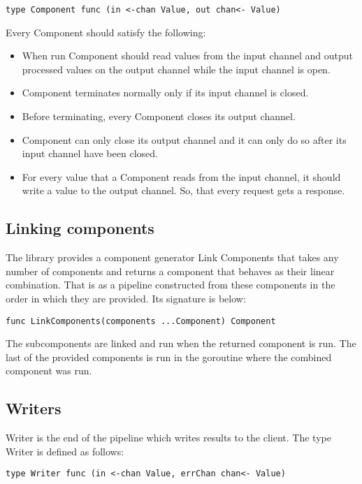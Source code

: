 \documentclass[12pt,a4paper]{article}
\begin{document}
\begin{lstlisting}
type Component func (in <-chan Value, out chan<- Value)
\end{lstlisting}

Every Component should satisfy the following:
\begin{itemize}
  \item When run Component should read values from the input channel
				and output processed values on the output channel while the input 
				channel is open.
	\item Component terminates normally only if its input channel is closed.
	\item Before terminating, every Component closes its output channel.
	\item Component can only close its output channel and it can only do so
				after its input channel have been closed.
	\item For every value that a Component reads from the input channel, 
				it should write a value to the output channel. So, that every request 
				gets a response.
  
\end{itemize}

\subsection{Linking components}
The library provides a component generator Link Components that takes 
any number of components and returns a component that behaves as their 
linear combination. That is as a pipeline constructed from these components 
in the order in which they are provided. Its signature is below:
\begin{lstlisting}
func LinkComponents(components ...Component) Component
\end{lstlisting}
The subcomponents are linked and run when the returned component is run. 
The last of the provided components is run in the goroutine where
the combined component was run.

\subsection{Writers}
Writer is the end of the pipeline which writes results to the client.
The type Writer is defined as follows:

\begin{lstlisting}
type Writer func (in <-chan Value, errChan chan<- Value)
\end{lstlisting}
\end{document}
